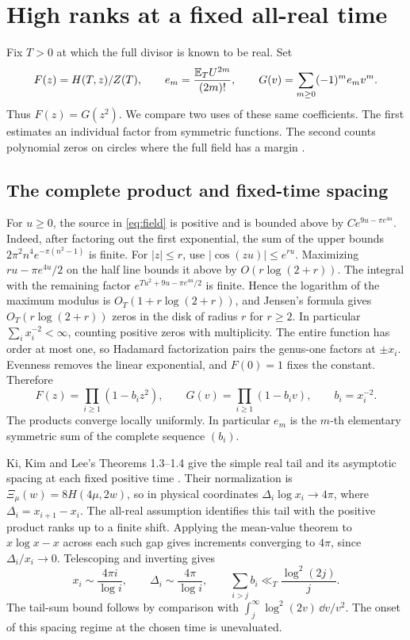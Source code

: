 \section{High ranks at a fixed all-real time}\label{sec:comparison}

Fix \(T>0\) at which the full divisor is known to be real. Set
\[
 F(z)=H(T,z)/Z(T),\qquad e_m=\frac{\mathbb E_T U^{2m}}{(2m)!},\qquad
 G(v)=\sum_{m\ge0}(-1)^m e_m v^m .
\]
Thus \(F(z)=G(z^2)\). We compare two uses of these same coefficients. The
first estimates an individual factor from symmetric functions. The second
counts polynomial zeros on circles where the full field has a margin
\cite{Founding07,EZHighRank}.

\subsection{The complete product and fixed-time spacing}

For \(u\ge0\), the source in \eqref{eq:field} is positive and is bounded
above by \(C e^{9u-\pi e^{4u}}\). Indeed, after factoring out the first
exponential, the sum of the upper bounds \(2\pi^2 n^4 e^{-\pi(n^2-1)}\)
is finite. For \(|z|\le r\), use \(|\cos(zu)|\le e^{ru}\).
Maximizing \(ru-\pi e^{4u}/2\) on the half line bounds it above by
\(O(r\log(2+r))\). The integral with the remaining factor
\(e^{Tu^2+9u-\pi e^{4u}/2}\) is finite. Hence the logarithm of the
maximum modulus is \(O_T(1+r\log(2+r))\), and Jensen's formula gives
\(O_T(r\log(2+r))\) zeros in the disk of radius \(r\) for \(r\ge2\).
In particular \(\sum_i x_i^{-2}<\infty\), counting positive zeros with
multiplicity. The entire function has order at most one, so Hadamard
factorization pairs the genus-one factors at \(\pm x_i\). Evenness removes
the linear exponential, and \(F(0)=1\) fixes the constant. Therefore
\begin{equation}\label{eq:all-real-product}
 F(z)=\prod_{i\ge1}(1-b_i z^2),\qquad
 G(v)=\prod_{i\ge1}(1-b_i v),\qquad b_i=x_i^{-2}.
\end{equation}
The products converge locally uniformly. In particular \(e_m\) is the
\(m\)-th elementary symmetric sum of the complete sequence \((b_i)\).

Ki, Kim and Lee's Theorems 1.3--1.4 give the simple real tail and its
asymptotic spacing at each fixed positive time \cite{KiKimLee2009}.
Their normalization is \(\Xi_\mu(w)=8H(4\mu,2w)\), so in physical
coordinates \(\Delta_i\log x_i\to4\pi\), where
\(\Delta_i=x_{i+1}-x_i\). The all-real assumption identifies this tail
with the positive product ranks up to a finite shift. Applying the
mean-value theorem to \(x\log x-x\) across each such gap gives increments
converging to \(4\pi\), since \(\Delta_i/x_i\to0\).
Telescoping and inverting gives
\begin{equation}\label{eq:high-rank-geometry}
 x_i\sim\frac{4\pi i}{\log i},\qquad
 \Delta_i\sim\frac{4\pi}{\log i},\qquad
 \sum_{i>j}b_i\ll_T\frac{\log^2(2j)}{j}.
\end{equation}
The tail-sum bound follows by comparison with
\(\int_j^\infty \log^2(2v)\,\dd v/v^2\). The onset of this spacing
regime at the chosen time is unevaluated.

